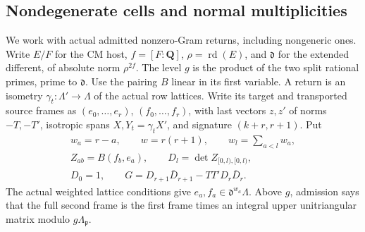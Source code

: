\subsection{Nondegenerate cells and normal multiplicities}
\label{sec:flag-nondegenerate-normal-count}

We work with actual admitted nonzero-Gram returns, including
nongeneric ones. Write \(E/F\) for the CM host, \(f=[F:\mathbf Q]\),
\(\rho=\operatorname{rd}(E)\), and \(\mathfrak d\) for the extended
different, of absolute norm \(\rho^{2f}\). The level \(g\) is the
product of the two split rational primes, prime to \(\mathfrak d\).
Use the pairing \(B\) linear in its first variable. A return is an
isometry \(\gamma_t:\Lambda'\to\Lambda\) of the actual row lattices.
Write its target and transported source frames as
\((e_0,\dots,e_r)\), \((f_0,\dots,f_r)\), with last vectors \(z,z'\)
of norms \(-T,-T'\), isotropic spans \(X,Y_t=\gamma_t X'\), and
signature \((k+r,r+1)\). Put
\[
 \begin{gathered}
 w_a=r-a,\qquad w=r(r+1),\qquad w_l=\sum_{a<l}w_a,\\
 Z_{ab}=B(f_b,e_a),\qquad D_l=\det Z_{[0,l),[0,l)},\\
 D_0=1,\qquad G=D_{r+1}\bar D_{r+1}-TT'D_r\bar D_r.
 \end{gathered}
\]
The actual weighted lattice conditions give
\(e_a,f_a\in\mathfrak d^{w_a}\Lambda\).
Above \(g\), admission says that the full second frame is the
first frame times an integral upper unitriangular matrix modulo
\(g\Lambda_{\mathfrak p}\).

